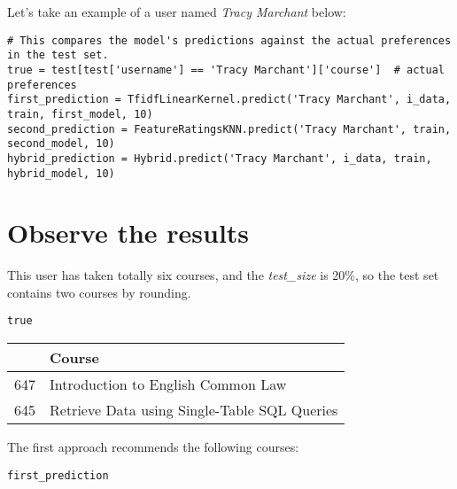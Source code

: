 Let's take an example of a user named \textit{Tracy Marchant} below:

\begin{verbatim}
# This compares the model's predictions against the actual preferences in the test set.
true = test[test['username'] == 'Tracy Marchant']['course']  # actual preferences
first_prediction = TfidfLinearKernel.predict('Tracy Marchant', i_data, train, first_model, 10)
second_prediction = FeatureRatingsKNN.predict('Tracy Marchant', train, second_model, 10)
hybrid_prediction = Hybrid.predict('Tracy Marchant', i_data, train, hybrid_model, 10)
\end{verbatim}

\section{Observe the results}

This user has taken totally six courses, and the \textit{test\_size} is 20\%, 
so the test set contains two courses by rounding.

\begin{verbatim}
true
\end{verbatim}

\begin{table}[H]
\small
\begin{tabular}{|p{0.5cm}|p{10cm}|}
\hline
& Course \\
\hline
647 & Introduction to English Common Law \\
645 & Retrieve Data using Single-Table SQL Queries \\
\hline
\end{tabular}
\end{table}

\newpage
\noindent The first approach recommends the following courses:

\begin{verbatim}
first_prediction
\end{verbatim}

